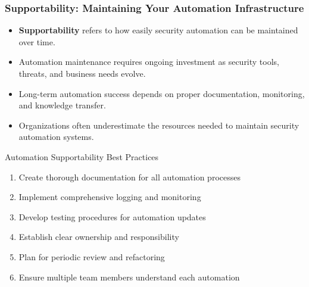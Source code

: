 \documentclass{beamer}
\begin{document}
\begin{frame}
  \frametitle{Supportability: Maintaining Your Automation Infrastructure}
  
  \begin{itemize}
    \item \textbf{Supportability} refers to how easily security automation can be maintained over time.
    \item Automation maintenance requires ongoing investment as security tools, threats, and business needs evolve.
    \item Long-term automation success depends on proper documentation, monitoring, and knowledge transfer.
    \item Organizations often underestimate the resources needed to maintain security automation systems.
  \end{itemize}
  
  \begin{block}{Automation Supportability Best Practices}
    \scriptsize
    \begin{enumerate}
      \item Create thorough documentation for all automation processes
      \item Implement comprehensive logging and monitoring
      \item Develop testing procedures for automation updates
      \item Establish clear ownership and responsibility
      \item Plan for periodic review and refactoring
      \item Ensure multiple team members understand each automation
    \end{enumerate}
  \end{block}
\end{frame}
\end{document}
